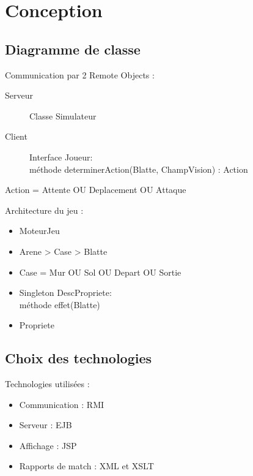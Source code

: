 \section{Conception}

\subsection{Diagramme de classe}

\begin{frame}[c]{\insertsubsection{}}
    \begin{block}
        Communication par 2 Remote Objects :
        \begin{description}
            \item[Serveur] Classe Simulateur
            \item[Client] Interface Joueur: \\
                méthode determinerAction(Blatte, ChampVision) : Action
        \end{description}

        Action = Attente OU Deplacement OU Attaque
    \end{block}
\end{frame}

\begin{frame}
    \begin{block}
        Architecture du jeu :
        \begin{itemize}
            \item MoteurJeu
            \item Arene > Case > Blatte
            \item Case = Mur OU Sol OU Depart OU Sortie
            \item Singleton DescPropriete: \\
                 méthode effet(Blatte)
             \item Propriete
        \end{itemize}
    \end{block}
\end{frame}

\subsection{Choix des technologies}

\begin{frame}[c]{\insertsubsection}
    \begin{block}{Technologies utilisées :}
        \begin{itemize}
        \item Communication : RMI 
        \item Serveur : EJB
        \item Affichage : JSP
        \item Rapports de match : XML et XSLT
        \end{itemize}
    \end{block}
\end{frame}

